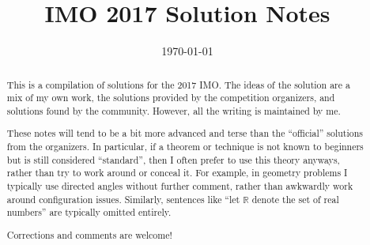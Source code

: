 \documentclass[11pt]{scrartcl}
\title{IMO 2017 Solution Notes}
\date{\today}
\begin{document}
\maketitle

\begin{abstract}
This is a compilation of solutions
for the 2017 IMO.
The ideas of the solution are a mix of my own work,
the solutions provided by the competition organizers,
and solutions found by the community.
However, all the writing is maintained by me.

These notes will tend to be a bit more advanced and terse than the ``official''
solutions from the organizers.
In particular, if a theorem or technique is not known to beginners
but is still considered ``standard'', then I often prefer to
use this theory anyways, rather than try to work around or conceal it.
For example, in geometry problems I typically use directed angles
without further comment, rather than awkwardly work around configuration issues.
Similarly, sentences like ``let $\mathbb{R}$ denote the set of real numbers''
are typically omitted entirely.

Corrections and comments are welcome!
\end{abstract}

\tableofcontents
\newpage

\addtocounter{section}{-1}
\end{document}

